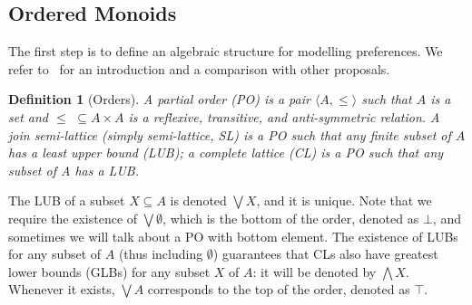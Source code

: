 \documentclass[a4paper]{elsarticle}
\newtheorem{definition}{Definition}
\newcommand{\1}{\mathbf{1}}
\begin{document}
\subsection{Ordered Monoids}
\label{sec:lem}

The first step is to define an algebraic structure for modelling preferences. 
We refer to~\cite{ipl} %
for an introduction and a comparison with other proposals.

\begin{definition}[Orders]
	A partial order (PO) is a pair $\langle A, \leq \rangle$ such that
	$A$ is a set %
	and $\leq \,\,\subseteq A \times A$ is a reflexive, transitive, and
	anti-symmetric  relation.
	A join semi-lattice (simply semi-lattice, SL) is a PO
	such that any finite subset of $A$ has a least upper bound (LUB);
	a complete lattice (CL) is a PO such that any subset of A has a LUB.
\end{definition}

The LUB of a subset $X \subseteq A$ is denoted $\bigvee X$, and it is unique. 
Note that we require the existence of $\bigvee \emptyset$, which is the bottom
of the order, denoted as $\bot$, and sometimes we will talk about a PO with bottom element.
The existence of LUBs for any subset of $A$ (thus including $\emptyset$) guarantees that 
CLs also have greatest lower bounds (GLBs) for any subset $X$ of $A$: 
it will be denoted by $\bigwedge X$. 
Whenever it exists, 
$\bigvee A$ corresponds to the top of the order, denoted as $\top$.
%

%

\end{document}
